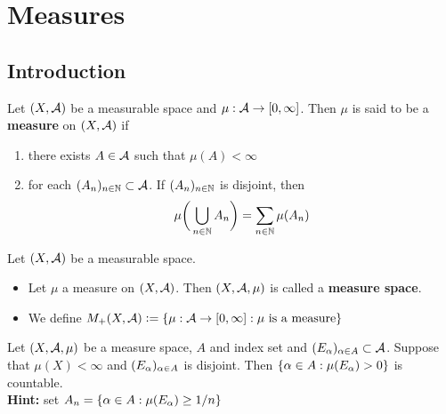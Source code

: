 \documentclass{book}
\begin{document}
	
	
	
	
	
	
	
	
	
	
	
	
	
	
	
	
	
	
	
	
	
	\newpage
	\chapter{Measures}
	
	\section{Introduction}
	
	\begin{defn} 
		Let $(X, \mathcal{A})$ be a measurable space and $\mu:\mathcal{A} \rightarrow [0,\infty]$. Then $\mu$ is said to be a \textbf{measure} on $(X, \mathcal{A})$ if 
		\begin{enumerate}
			\item there exists $A \in \mathcal{A}$ such that $\mu(A)< \infty$
			\item for each $(A_n)_{n \in \mathbb{N}} \subset \mathcal{A}$. If $(A_n)_{n \in \mathbb{N}}$ is disjoint, then $$\mu\bigg(\bigcup_{n \in \mathbb{N}}A_n \bigg) = \sum_{n \in \mathbb{N}}\mu(A_n)$$
		\end{enumerate}
	\end{defn}
	
	\begin{defn} 
		Let $(X,\mathcal{A})$ be a measurable space. 
		\begin{itemize}
			\item Let $\mu$ a measure on $(X, \mathcal{A})$. Then $(X, \mathcal{A}, \mu)$ is called a \textbf{measure space}. 
			\item We define $M_+(X, \mathcal{A}) \vcentcolon= \{\mu: \mathcal{A} \rightarrow [0,\infty]: \mu \text{ is a measure}\}$
		\end{itemize}
	\end{defn}
	
	\begin{ex} 
	Let $(X, \mathcal{A}, \mu)$ be a measure space, $A$ and index set and $(E_{\alpha})_{\alpha \in A} \subset \mathcal{A}$. Suppose that $\mu(X) < \infty$ and $(E_\alpha)_{\alpha \in A }$ is disjoint. Then $\{\alpha \in A: \mu(E_{\alpha}) >0\}$ is countable.\\
	\textbf{Hint:} set $A_n = \{\alpha \in A: \mu(E_{\alpha}) \geq 1/n \}$ 
	\end{ex}
	
\end{document}
